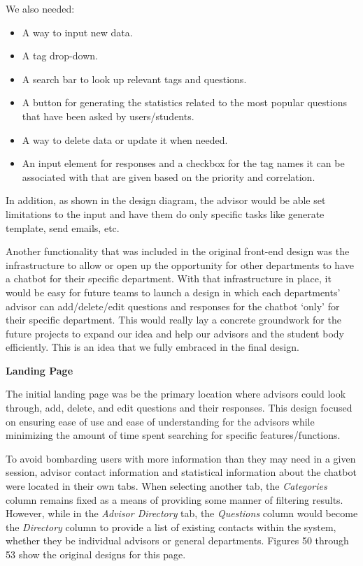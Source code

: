 \documentclass[titlepage, 12pt]{article}
\begin{document}
We also needed:

\begin{itemize}
    \item A way to input new data.
    \item A tag drop-down.
    \item A search bar to look up relevant tags and questions.
    \item A button for generating the statistics related to the most popular questions that have been asked by users/students.
    \item A way to delete data or update it when needed.
    \item An input element for responses and a checkbox for the tag names it can be associated with that are given based on the priority and correlation.
\end{itemize}

In addition, as shown in the design diagram, the advisor would be able set limitations to the input and have them do only specific tasks like generate template, send emails, etc.

Another functionality that was included in the original front-end design was the infrastructure to allow or open up the opportunity for other departments to have a chatbot for their specific department. With that infrastructure in place, it would be easy for future teams to launch a design in which each departments’ advisor can add/delete/edit questions and responses for the chatbot ‘only’ for their specific department. This would really lay a concrete groundwork for the future projects to expand our idea and help our advisors and the student body efficiently. This is an idea that we fully embraced in the final design.

\textbf{Landing Page}

The initial landing page was be the primary location where advisors could look through, add, delete, and edit questions and their responses. This design focused on ensuring ease of use and ease of understanding for the advisors while minimizing the amount of time spent searching for specific features/functions.

To avoid bombarding users with more information than they may need in a given session, advisor contact information and statistical information about the chatbot were located in their own tabs. When selecting another tab, the \emph{Categories} column remains fixed as a means of providing some manner of filtering results. However, while in the \emph{Advisor Directory} tab, the \emph{Questions} column would become the \emph{Directory} column to provide a list of existing contacts within the system, whether they be individual advisors or general departments. Figures 50 through 53 show the original designs for this page.
\end{document}

